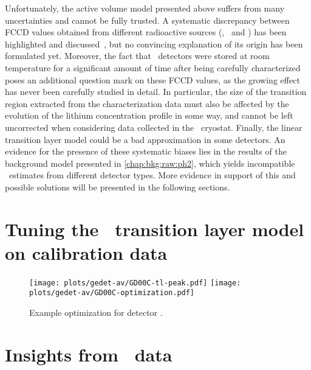 Unfortunately, the active volume model presented above suffers from many uncertainties and
cannot be fully trusted. A systematic discrepancy between FCCD values obtained from
different radioactive sources (\Am, \Ba\ and \Co) has been highlighted and
discussed~\cite{Lehnert2016}, but no convincing explanation of its origin has been
formulated yet. Moreover, the fact that \bege\ detectors were stored at room temperature
for a significant amount of time after being carefully characterized poses an additional
question mark on these FCCD values, as the growing effect has never been carefully studied
in detail. In particular, the size of the transition region extracted from the
characterization data must also be affected by the evolution of the lithium concentration
profile in some way, and cannot be left uncorrected when considering data collected in the
\gerda\ cryostat. Finally, the linear transition layer model could be a bad approximation
in some detectors. An evidence for the presence of these systematic biases lies in the
results of the background model presented in \cref{chap:bkg:raw:ph2}, which yields
incompatible \thalftwo\ estimates from different detector types. More evidence in support
of this and possible solutions will be presented in the following sections.

\section{Tuning the \bege\ transition layer model on calibration data}%
\label{sec:gedetav:calib-optim}


\begin{table}
  \centering
  \caption{%
    \bege\ dead layer fractions obtained from calibration data. 
  }\label{tab:gedetav:calib-optim}
  
\end{table}

\begin{figure}
  \centering
  \texttt{[image: plots/gedet-av/GD00C-tl-peak.pdf]}%
  \texttt{[image: plots/gedet-av/GD00C-optimization.pdf]}
  \caption{%
    Example optimization for detector . 
  }\label{fig:gedetav:example-optim}
\end{figure}

\section{Insights from \Arl\ data}%
\label{src:gedetav:ar39}

